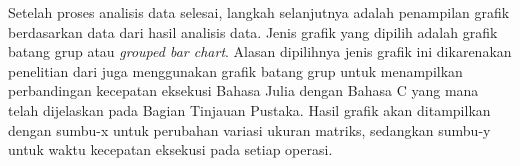Setelah proses analisis data selesai, langkah selanjutnya adalah penampilan
grafik berdasarkan data dari hasil analisis data. Jenis grafik yang dipilih
adalah grafik batang grup atau \emph{grouped bar chart}. Alasan dipilihnya
jenis grafik ini dikarenakan penelitian dari
\cite{hunoldBenchmarkingJuliaCommunication2020} juga menggunakan grafik batang
grup untuk menampilkan perbandingan kecepatan eksekusi Bahasa Julia dengan
Bahasa C yang mana telah dijelaskan pada Bagian Tinjauan Pustaka. Hasil grafik
akan ditampilkan dengan sumbu-x untuk perubahan variasi ukuran matriks,
sedangkan sumbu-y untuk waktu kecepatan eksekusi pada setiap operasi.




